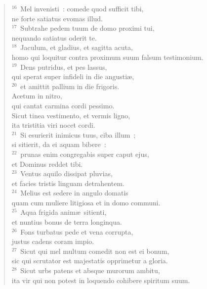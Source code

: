 \begin{flushleft}\begin{verse}${}^{16}$~Mel invenisti~: comede quod sufficit tibi,\\ ne forte satiatus evomas illud.\\
${}^{17}$~Subtrahe pedem tuum de domo proximi tui,\\ nequando satiatus oderit te.\\
${}^{18}$~Jaculum, et gladius, et sagitta acuta,\\ homo qui loquitur contra proximum suum falsum testimonium.\\
${}^{19}$~Dens putridus, et pes lassus,\\ qui sperat super infideli in die angusti\ae ,\\
${}^{20}$~et amittit pallium in die frigoris.\\ Acetum in nitro,\\ qui cantat carmina cordi pessimo.\\ Sicut tinea vestimento, et vermis ligno,\\ ita tristitia viri nocet cordi.\\
${}^{21}$~Si esurierit inimicus tuus, ciba illum~;\\ si sitierit, da ei aquam bibere~:\\
${}^{22}$~prunas enim congregabis super caput ejus,\\ et Dominus reddet tibi.\\
${}^{23}$~Ventus aquilo dissipat pluvias,\\ et facies tristis linguam detrahentem.\\
${}^{24}$~Melius est sedere in angulo domatis\\ quam cum muliere litigiosa et in domo communi.\\
${}^{25}$~Aqua frigida anim\ae\ sitienti,\\ et nuntius bonus de terra longinqua.\\
${}^{26}$~Fons turbatus pede et vena corrupta,\\ justus cadens coram impio.\\
${}^{27}$~Sicut qui mel multum comedit non est ei bonum,\\ sic qui scrutator est majestatis opprimetur a gloria.\\
${}^{28}$~Sicut urbs patens et absque murorum ambitu,\\ ita vir qui non potest in loquendo cohibere spiritum suum.\end{verse}\end{flushleft}


